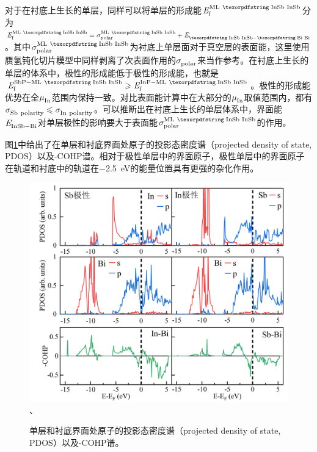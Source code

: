 

对于在衬底上生长的单层，同样可以将单层的形成能$\energyVar{f}{ML\ \cemb{InSb}}$分为$\energyVar{f}{ML\ \cemb{InSb}}=\sigmaVar{polar}{ML\ \cemb{InSb}}+\energyVar{\cemb{InSb}-\cemb{Bi}}{}$。其中$\sigmaVar{polar}{ML\ \cemb{InSb}}$为衬底上单层面对于真空层的表面能，这里使用赝氢钝化切片模型中同样剥离了次表面作用的$\it \sigma_{\rm polar}^{\rm } \it$来当作参考。在衬底上生长的单层的体系中，极性的形成能低于极性的形成能，也就是$\energyVar{f}{SbP-ML\ \cemb{InSb}} \geqslant \energyVar{f}{InP-ML\ \cemb{InSb}}$。极性的形成能优势在全$\it \mu_{\rm In}^{\rm } \it$范围内保持一致。对比表面能计算中在大部分的$\it \mu_{\rm In}^{\rm } \it$取值范围内，都有$\sigmaVar{Sb\ polarity}{} \leqslant \sigmaVar{In\ polarity}{}$。可以推断出在衬底上生长的单层体系中，界面能$\it E_{\rm InSb-Bi}^{\rm } \it$对单层极性的影响要大于表面能$\sigmaVar{polar}{ML\ \cemb{InSb}}$的作用。

图\ref{fig:IS_DFT_PDOS}中给出了在单层和衬底界面处原子的投影态密度谱（projected density of state, PDOS）以及-COHP谱。相对于极性单层中的界面原子，极性单层中的界面原子在轨道和衬底中的轨道在\SI{-2.5}{\electronvolt}的能量位置具有更强的杂化作用。

\begin{figure}[!htb]
    \includegraphics{pic/IS_DFT_PDOS-COHP.png}、
    \caption{单层和衬底界面处原子的投影态密度谱（projected density of state, PDOS）以及-COHP谱。 }
    \label{fig:IS_DFT_PDOS}
\end{figure}

